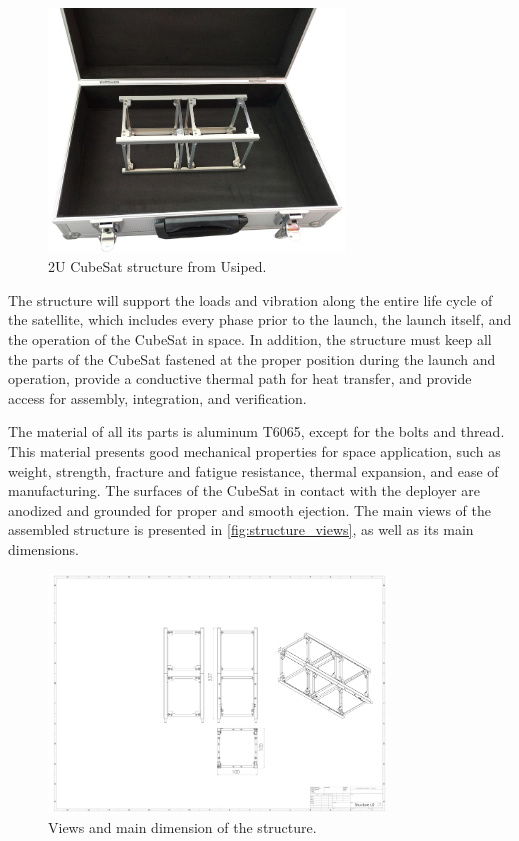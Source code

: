 \begin{figure}[!ht]
    \begin{center}
        \includegraphics[width=0.7\textwidth]{figures/usiped-2u-structure.jpg}
        \caption{2U CubeSat structure from Usiped.}
        \label{fig:usiped-structure}
    \end{center}
\end{figure}

The structure will support the loads and vibration along the entire life cycle of the satellite, which includes every phase prior to the launch, the launch itself, and the operation of the CubeSat in space. In addition, the structure must keep all the parts of the CubeSat fastened at the proper position during the launch and operation, provide a conductive thermal path for heat transfer, and provide access for assembly, integration, and verification.

The material of all its parts is aluminum T6065, except for the bolts and thread. This material presents good mechanical properties for space application, such as weight, strength, fracture and fatigue resistance, thermal expansion, and ease of manufacturing. The surfaces of the CubeSat in contact with the deployer are anodized and grounded for proper and smooth ejection. The main views of the assembled structure is presented in \autoref{fig:structure_views}, as well as its main dimensions.


\begin{figure}[H]
	\begin{center}
		\includegraphics[width=0.8\textwidth, trim=25cm 8cm 30cm 13cm, clip=true]{figures/Structure U2.pdf}
		\caption{Views and main dimension of the structure.}
		\label{fig:structure_views}
	\end{center}
\end{figure}

